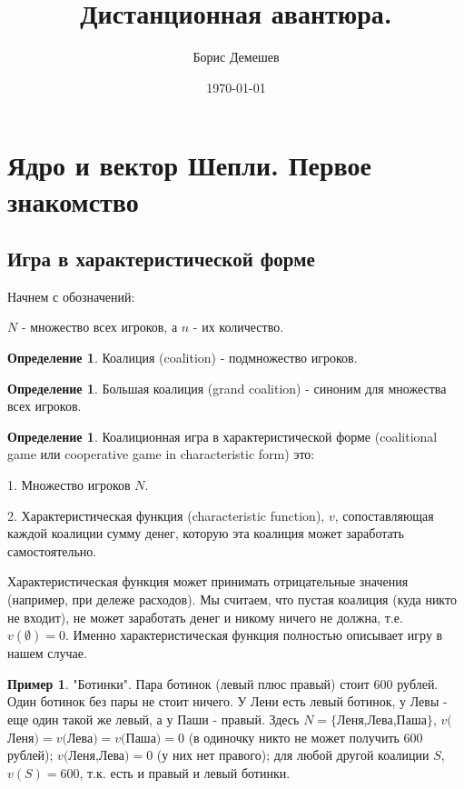 \documentclass[pdftex,12pt,a4paper]{article}
\title{Дистанционная авантюра.}
\author{Борис Демешев}
\date{\today}
\numberwithin{equation}{page} %
\theoremstyle{definition} %
\newtheorem{definition}[equation]{Определение}
\theoremstyle{definition}
\newtheorem{myex}[equation]{Пример}
\theoremstyle{definition}
\begin{document}

\section{Ядро и вектор Шепли. Первое знакомство}

\subsection{Игра в характеристической форме}

Начнем с обозначений:

$N$ - множество всех игроков, а $n$ - их количество.

\begin{definition}
Коалиция (coalition) - подмножество игроков.
\end{definition}

\begin{definition}
Большая коалиция (grand coalition) - синоним для множества всех игроков.
\end{definition}


\begin{definition}
Коалиционная игра в характеристической форме (coalitional game или cooperative game in characteristic form) это:

1. Множество игроков $N$.

2. Характеристическая функция (characteristic function), $v$, сопоставляющая каждой коалиции сумму денег, которую эта коалиция может заработать самостоятельно.
\end{definition}

Характеристическая функция может принимать отрицательные значения (например, при дележе расходов). Мы считаем, что пустая коалиция (куда никто не входит), не может заработать денег и никому ничего не должна, т.е. $v(\emptyset)=0$. Именно характеристическая функция полностью описывает игру в нашем случае.

\begin{myex} "Ботинки". Пара ботинок (левый плюс правый) стоит 600 рублей. Один ботинок без пары не стоит ничего. У Лени есть левый ботинок, у Левы - еще один такой же левый, а у Паши - правый. Здесь $N=\{$Леня,Лева,Паша$\}$, $v($Леня$)=v($Лева$)=v($Паша$)=0$ (в одиночку никто не может получить 600 рублей); $v($Леня,Лева$)=0$ (у них нет правого); для любой другой коалиции $S$, $v(S)=600$, т.к. есть и правый и левый ботинки. 
\end{myex}
\end{document}
